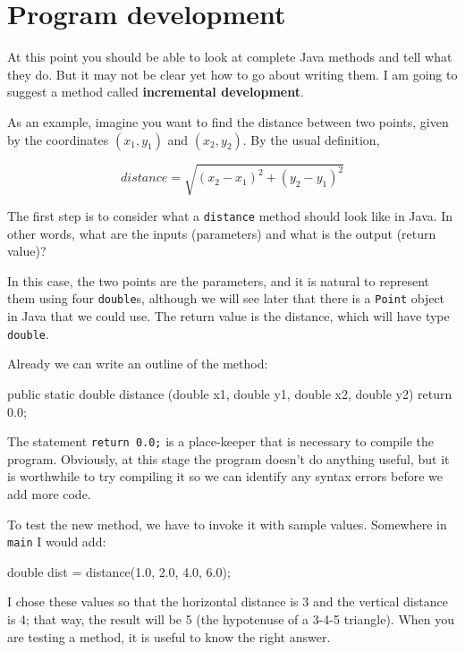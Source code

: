 \section{Program development}
\label{distance}

At this point you should be able to look at complete Java methods and
tell what they do.  But it may not be clear yet how to go about
writing them.  I am going to suggest a method called {\bf incremental
  development}.

As an example, imagine you want to find the distance between
two points, given by the coordinates $(x_1, y_1)$ and
$(x_2, y_2)$.  By the usual definition,

\begin{equation*}
distance = \sqrt{(x_2 - x_1)^2 +(y_2 - y_1)^2}
\end{equation*}

The first step is to consider what a {\tt distance} method
should look like in Java.  In other words, what are the inputs
(parameters) and what is the output (return value)?

In this case, the two points are the parameters, and it is
natural to represent them using four {\tt double}s, although
we will see later that there is a {\tt Point} object in Java
that we could use.  The return value is the distance, which
will have type {\tt double}.

Already we can write an outline of the method:

\begin{code}
  public static double distance
              (double x1, double y1, double x2, double y2) {
    return 0.0;
  }
\end{code}

The statement {\tt return 0.0;} is a place-keeper that is necessary
to compile the program.  Obviously, at this stage the
program doesn't do anything useful, but it is worthwhile to
try compiling it so we can identify any syntax errors before
we add more code.

To test the new method, we have to invoke it with
sample values.  Somewhere in {\tt main} I would add:

\begin{code}
    double dist = distance(1.0, 2.0, 4.0, 6.0);
\end{code}

I chose these values so that the horizontal
distance is 3 and the vertical distance is 4; that way,
the result will be 5 (the hypotenuse of a 3-4-5 triangle).
When you are testing a method, it is useful to know the right
answer.

